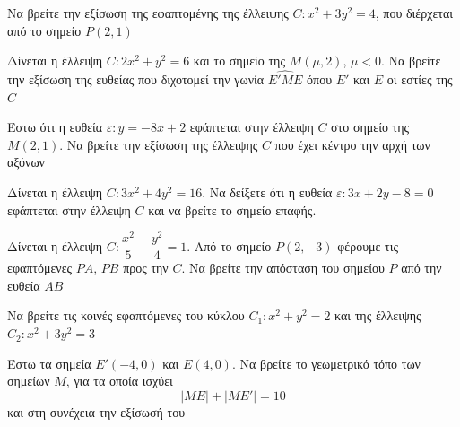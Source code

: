 \documentclass[greek]{beamer}
\begin{document}
\begin{askisi}
  Να βρείτε την εξίσωση της εφαπτομένης της έλλειψης $C:x^2+3y^2=4$, που διέρχεται από το σημείο $Ρ(2,1)$


\end{askisi}

\begin{askisi}
  Δίνεται η έλλειψη $C:2x^2+y^2=6$ και το σημείο της $Μ(μ,2)$, $μ<0$. Να βρείτε την εξίσωση της ευθείας που διχοτομεί την γωνία $\widehat{Ε'ΜΕ}$ όπου $Ε'$ και $Ε$ οι εστίες της $C$


\end{askisi}

\begin{askisi}
  Έστω ότι η ευθεία $ε:y=-8x+2$ εφάπτεται στην έλλειψη $C$ στο σημείο της $Μ(2,1)$. Να βρείτε την εξίσωση της έλλειψης $C$ που έχει κέντρο την αρχή των αξόνων


\end{askisi}

\begin{askisi}
  Δίνεται η έλλειψη $C:3x^2+4y^2=16$. Να δείξετε ότι η ευθεία $ε:3x+2y-8=0$ εφάπτεται στην έλλειψη $C$ και να βρείτε το σημείο επαφής.


\end{askisi}

\begin{askisi}
  Δίνεται η έλλειψη $C:\dfrac{x^2}{5}+\dfrac{y^2}{4}=1$. Από το σημείο $Ρ(2,-3)$ φέρουμε τις εφαπτόμενες $ΡΑ$, $ΡΒ$ προς την $C$. Να βρείτε την απόσταση του σημείου $Ρ$ από την ευθεία $ΑΒ$


\end{askisi}

\begin{askisi}
  Να βρείτε τις κοινές εφαπτόμενες του κύκλου $C_1:x^2+y^2=2$ και της έλλειψης $C_2:x^2+3y^2=3$


\end{askisi}

\begin{askisi}
  Έστω τα σημεία $Ε'(-4,0)$ και $Ε(4,0)$. Να βρείτε το γεωμετρικό τόπο των σημείων $Μ$, για τα οποία ισχύει
  $$|ΜΕ|+|ΜΕ'|=10$$
  και στη συνέχεια την εξίσωσή του


\end{askisi}
\end{document}
